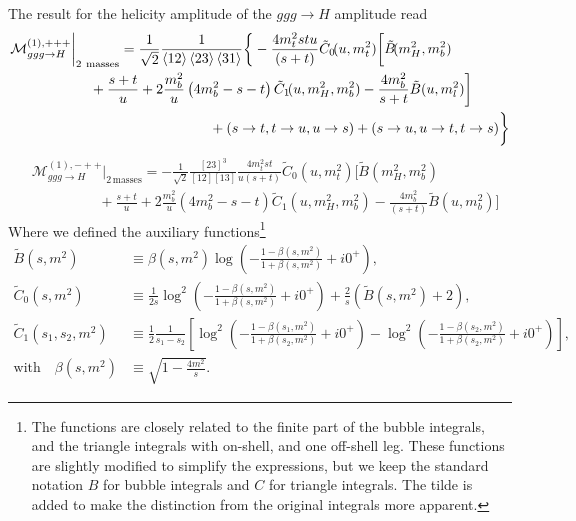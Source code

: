 The result for the helicity amplitude of the $ggg \rightarrow H$ amplitude read
\begin{equation}
\begin{split}
&\mathcal{M}^{(1),+++}_{ggg \rightarrow H} \bigg \vert_{2\ \text{masses}} = \frac{1}{\sqrt{2}} \frac{1}{\braket{12}\braket{23} \braket{31}} \bigg \lbrace -  \frac{4 m_t^2 s t u}{(s + t)} \tilde{C}_0\!(u, m_t^2) \bigg [ \tilde{B}\!(m_H^2, m_b^2)  \\
& \hspace{2cm} + \frac{s + t}{u} + 2 \frac{m_b^2}{u} \left( 4 m_b^2 - s - t \right) \tilde{C}_1\!(u, m_H^2, m_b^2) - \frac{4 m_b^2}{s + t} \tilde{B}(u, m_l^2)  \bigg ] \\
& \hspace{5cm} + (s \rightarrow t, t \rightarrow u, u \rightarrow s) + (s \rightarrow u, u \rightarrow t, t \rightarrow s)\bigg \rbrace
\label{eq:5:ggg_ppp}
\end{split}
\end{equation}
%
%
\begin{equation}
\begin{split}
&\mathcal{M}^{(1),-++}_{ggg \rightarrow H} \bigg \vert_{2\, \text{masses}} = -\frac{1}{\sqrt{2}} \frac{[23]^3}{[12][13]} \frac{4 m_t^2 s t }{u(s + t)} \tilde{C}_0\!(u, m_t^2) \bigg [ \tilde{B}\!(m_H^2, m_b^2) \\
& \hspace{2cm} + \frac{s + t}{u} + 2 \frac{m_b^2}{u} \left(4 m_b^2 - s - t\right) \tilde{C}_1\!(u, m_H^2, m_b^2) - \frac{4 m_b^2}{(s + t)} \tilde{B}\!(u, m_b^2) \bigg ]
\label{eq:5:ggg_mpp}
\end{split}
\end{equation}
Where we defined the auxiliary functions\footnote{The functions are closely related to the finite part of the bubble integrals, and the triangle integrals with on-shell, and one off-shell leg. These functions are slightly modified to simplify the expressions, but we keep the standard notation $B$ for bubble integrals and $C$ for triangle integrals. The tilde is added to make the distinction from the original integrals more apparent.}
\begin{equation}
\begin{split}
\tilde{B}\!(s, m^2) &\equiv \beta(s, m^2) \log\!\left(- \frac{1 - \beta(s, m^2)}{1 + \beta(s, m^2)} + i 0^+ \right), \\
\tilde{C}_0\!(s, m^2) &\equiv \frac{1}{2 s} \log^2\!\left(- \frac{1 - \beta(s, m^2)}{1 + \beta(s, m^2)} + i 0^+ \right) + \frac{2}{s} \left(\tilde{B}\!(s, m^2) + 2 \right), \\
\tilde{C}_1\!(s_1, s_2, m^2) &\equiv \frac{1}{2} \frac{1}{s_1 - s_2} \left[ \log^2\!\left(-\frac{1 - \beta(s_1, m^2)}{1 + \beta(s_2, m^2)} + i 0^+ \right) - \log^2\!\left(- \frac{1 - \beta(s_2, m^2)}{1 + \beta(s_2, m^2)} + i0^+\right) \right], \\
\text{with} \quad \beta(s, m^2) &\equiv \sqrt{1 - \frac{4 m^2}{s}}.
\label{eq:5:function_definitions}
\end{split}
\end{equation}
